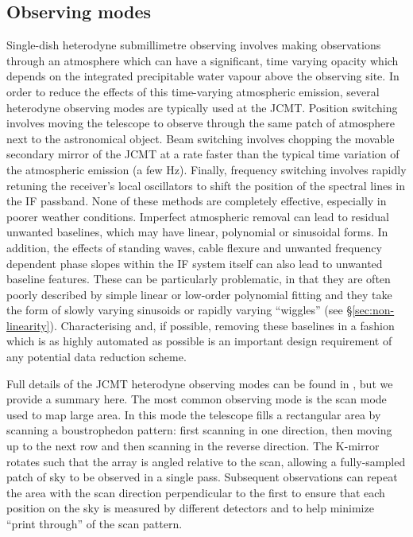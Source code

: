 \documentclass[useAMS,usenatbib]{mn2e}
\begin{document}
\subsection{Observing modes}
\label{sec:obsmodes}

Single-dish heterodyne submillimetre observing involves making
observations through an atmosphere which can have a significant, time
varying opacity which depends on the integrated precipitable water
vapour above the observing site. In order to reduce the effects of
this time-varying atmospheric emission, several heterodyne observing
modes are typically used at the JCMT. Position switching involves
moving the telescope to observe through the same patch of atmosphere
next to the astronomical object. Beam switching involves chopping the
movable secondary mirror of the JCMT at a rate faster than the
typical time variation of the atmospheric emission (a few
Hz). Finally, frequency switching involves rapidly retuning the
receiver's local oscillators to shift the position of the spectral
lines in the IF passband. None of these methods are completely
effective, especially in poorer weather conditions.  Imperfect
atmospheric removal can lead to residual unwanted baselines, which may
have linear, polynomial or sinusoidal forms. In addition, the effects
of standing waves, cable flexure and unwanted frequency dependent
phase slopes within the IF system itself can also lead to unwanted
baseline features. These can be particularly problematic, in that
they are often poorly described by simple linear or low-order polynomial
fitting and they take the form of slowly varying sinusoids or
rapidly varying ``wiggles'' (see \S\ref{sec:non-linearity}).
Characterising and, if possible, removing these baselines in a fashion
which is as highly automated as possible is an important design
requirement of any potential data reduction scheme.

Full details of the JCMT heterodyne observing modes can be found in
\citet{2009MNRAS.399.1026B}, but we provide a summary here. The most
common observing mode is the scan mode used to map large area. In this
mode the telescope fills a rectangular area by scanning a
boustrophedon pattern: first scanning in one direction, then moving up
to the next row and then scanning in the reverse direction. The
K-mirror rotates such that the array is angled relative to the scan,
allowing a fully-sampled patch of sky to be observed in a single
pass. Subsequent observations can repeat the area with the scan
direction perpendicular to the first to ensure that each position on
the sky is measured by different detectors and to help minimize
``print through'' of the scan pattern.
\end{document}
